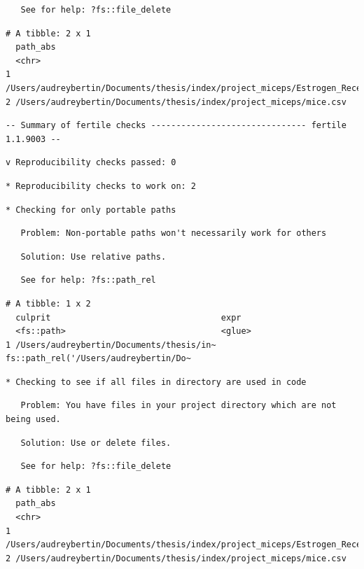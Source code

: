\documentclass[12pt,twoside]{reedthesis}
\begin{document}
\begin{verbatim}
   See for help: ?fs::file_delete
\end{verbatim}
\begin{verbatim}
# A tibble: 2 x 1
  path_abs                                                                      
  <chr>                                                                         
1 /Users/audreybertin/Documents/thesis/index/project_miceps/Estrogen_Receptors.~
2 /Users/audreybertin/Documents/thesis/index/project_miceps/mice.csv            
\end{verbatim}
\begin{verbatim}
-- Summary of fertile checks ------------------------------- fertile 1.1.9003 --
\end{verbatim}
\begin{verbatim}
v Reproducibility checks passed: 0
\end{verbatim}
\begin{verbatim}
* Reproducibility checks to work on: 2
\end{verbatim}
\begin{verbatim}
* Checking for only portable paths
\end{verbatim}
\begin{verbatim}
   Problem: Non-portable paths won't necessarily work for others
\end{verbatim}
\begin{verbatim}
   Solution: Use relative paths.
\end{verbatim}
\begin{verbatim}
   See for help: ?fs::path_rel
\end{verbatim}
\begin{verbatim}
# A tibble: 1 x 2
  culprit                                  expr                                 
  <fs::path>                               <glue>                               
1 /Users/audreybertin/Documents/thesis/in~ fs::path_rel('/Users/audreybertin/Do~
\end{verbatim}
\begin{verbatim}
* Checking to see if all files in directory are used in code
\end{verbatim}
\begin{verbatim}
   Problem: You have files in your project directory which are not being used.
\end{verbatim}
\begin{verbatim}
   Solution: Use or delete files.
\end{verbatim}
\begin{verbatim}
   See for help: ?fs::file_delete
\end{verbatim}
\begin{verbatim}
# A tibble: 2 x 1
  path_abs                                                                      
  <chr>                                                                         
1 /Users/audreybertin/Documents/thesis/index/project_miceps/Estrogen_Receptors.~
2 /Users/audreybertin/Documents/thesis/index/project_miceps/mice.csv            
\end{verbatim}
\normalsize
\end{document}
